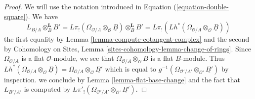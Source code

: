\documentclass[10pt,a4paper]{amsart}
\theoremstyle{plain}
\theoremstyle{definition}
\theoremstyle{remark}
\numberwithin{equation}{subsection}
\begin{document}
\begin{proof}
We will use the notation introduced in Equation (\ref{equation-double-square}).
We have
$$
L_{B/A} \otimes_B^\mathbf{L} B' =
L\pi_!(\Omega_{\mathcal{O}/A} \otimes_\mathcal{O} \underline{B})
\otimes_B^\mathbf{L} B' =
L\pi_!(Lh^*(\Omega_{\mathcal{O}/A} \otimes_\mathcal{O} \underline{B}))
$$
the first equality by Lemma \ref{lemma-compute-cotangent-complex}
and the second by Cohomology on Sites, Lemma
\ref{sites-cohomology-lemma-change-of-rings}.
Since $\Omega_{\mathcal{O}/A}$ is a flat $\mathcal{O}$-module,
we see that $\Omega_{\mathcal{O}/A} \otimes_\mathcal{O} \underline{B}$
is a flat $\underline{B}$-module. Thus
$Lh^*(\Omega_{\mathcal{O}/A} \otimes_\mathcal{O} \underline{B}) =
\Omega_{\mathcal{O}/A} \otimes_\mathcal{O} \underline{B'}$
which is equal to
$g^{-1}(\Omega_{\mathcal{O}'/A'} \otimes_{\mathcal{O}'} \underline{B'})$
by inspection.
we conclude by Lemma \ref{lemma-flat-base-change}
and the fact that $L_{B'/A'}$ is computed by
$L\pi'_!(\Omega_{\mathcal{O}'/A'} \otimes_{\mathcal{O}'} \underline{B'})$.
\end{proof}
\end{document}
